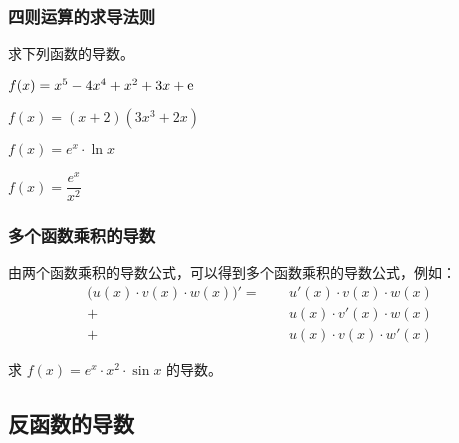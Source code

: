 \documentclass[14pt,notheorems,leqno,xcolor={rgb}]{beamer} %
\begin{document}
\begin{oframe}
\frametitle{四则运算的求导法则}
\begin{exercise}
求下列函数的导数。
\begin{enumlite}
  \item $f(x)=x^5-4x^4+x^2+3x+\mathrm{e}$
  \item $f(x)=(x+2)(3x^3+2x)$
  \item $f(x)=e^x\cdot\ln x$
  \item $f(x)=\dfrac{e^x}{x^2}$
\end{enumlite}
\end{exercise}
\end{oframe}


\begin{frame}
\frametitle{多个函数乘积的导数}
\begin{theorem}
由两个函数乘积的导数公式，可以得到多个函数乘积的导数公式，例如：
\begin{align*}
\Big(u(x)\cdot v(x)\cdot w(x)\Big)'=
  \phantom{+}&u'(x)\cdot v(x) \cdot w(x)\\
  +&u(x) \cdot v'(x)\cdot w(x)\\
  +&u(x) \cdot v(x) \cdot w'(x)
\end{align*}
\end{theorem}\pause%
\begin{example}
求 $f(x)=e^x\cdot x^2\cdot \sin x$ 的导数。
\end{example}
\end{frame}

\subsection{反函数的导数}
\end{document}
